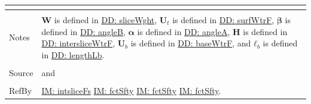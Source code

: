 \documentclass[12pt]{article}
\begin{document}
\begin{minipage}{\textwidth}
\begin{tabular}{p{} p{}}
\begin{symbDescription}
              \end{symbDescription}
\\ \midrule \\
Notes & $\mathbf{W}$ is defined in \hyperref[DD:sliceWght]{DD: sliceWght}, ${\mathbf{U}_{t}}$ is defined in \hyperref[DD:surfWtrF]{DD: surfWtrF}, $\mathbf{β}$ is defined in \hyperref[DD:angleB]{DD: angleB}, $\mathbf{α}$ is defined in \hyperref[DD:angleA]{DD: angleA}, $\mathbf{H}$ is defined in \hyperref[DD:intersliceWtrF]{DD: intersliceWtrF}, ${\mathbf{U}_{b}}$ is defined in \hyperref[DD:baseWtrF]{DD: baseWtrF}, and ${\mathbf{ℓ}_{b}}$ is defined in \hyperref[DD:lengthLb]{DD: lengthLb}.
\\ \midrule \\
Source & \cite{chen2005} and \cite{karchewski2012}
\\ \midrule \\
RefBy & \hyperref[IM:intsliceFs]{IM: intsliceFs} \hyperref[IM:fctSfty]{IM: fctSfty} \hyperref[IM:fctSfty]{IM: fctSfty} \hyperref[IM:fctSfty]{IM: fctSfty}.
\\ \bottomrule \end{tabular}
\end{minipage}
\par~
\end{document}
